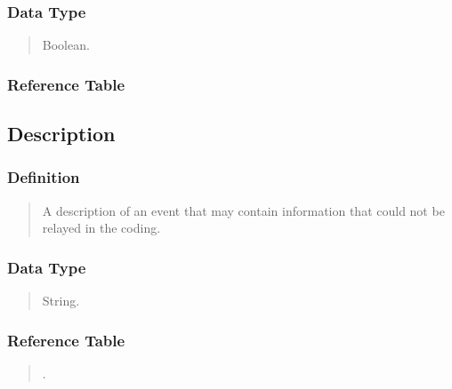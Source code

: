 \documentclass[letterpaper,10pt,english]{sphinxmanual}
\begin{document}
\subsubsection{Data Type}
\label{\detokenize{database_schema:id83}}\begin{quote}

\sphinxAtStartPar
Boolean.
\end{quote}


\subsubsection{Reference Table}
\label{\detokenize{database_schema:id84}}\begin{quote}

\sphinxAtStartPar
{\hyperref[\detokenize{database_schema:overview-table}]{}}
\end{quote}


\subsection{Description}
\label{\detokenize{database_schema:description}}

\subsubsection{Definition}
\label{\detokenize{database_schema:id85}}\begin{quote}

\sphinxAtStartPar
A description of an event that may contain information that could not be relayed in the coding.
\end{quote}


\subsubsection{Data Type}
\label{\detokenize{database_schema:id86}}\begin{quote}

\sphinxAtStartPar
String.
\end{quote}


\subsubsection{Reference Table}
\label{\detokenize{database_schema:id87}}\begin{quote}

\sphinxAtStartPar
{\hyperref[\detokenize{database_schema:overview-table}]{}}.
\end{quote}
\end{document}
